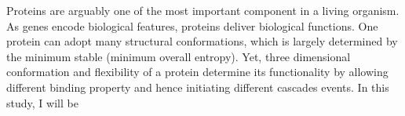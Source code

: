 Proteins are arguably one of the most important component in a living organism. As genes encode biological features, proteins deliver biological functions. One protein can adopt many structural conformations, which is largely determined by the minimum stable (minimum overall entropy). Yet, three dimensional conformation and flexibility of a protein determine its functionality by allowing different binding property and hence initiating different cascades events. In this study, I will be 